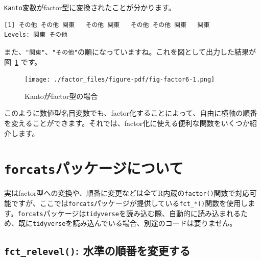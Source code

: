 \documentclass[
  a4paper,
  pandoc,
  ja=standard,
  jafont=haranoaji]{bxjsbook}
\newenvironment{Shaded}{\begin{snugshade}}{\end{snugshade}}
\newcommand{\NormalTok}[1]{\textcolor[rgb]{0.00,0.48,0.65}{#1}}
\newcommand{\SpecialCharTok}[1]{\textcolor[rgb]{0.37,0.37,0.37}{#1}}
\begin{document}
\texttt{Kanto}変数がfactor型に変換されたことが分かります。

\begin{Shaded}
\end{Shaded}

\begin{verbatim}
[1] その他 その他 関東   その他 関東   その他 その他 関東   関東  
Levels: 関東 その他
\end{verbatim}

また、\texttt{"関東"}、\texttt{"その他"}の順になっていますね。これを図として出力した結果が
図~\ref{fig-factor6} です。

\begin{figure}

{\centering \texttt{[image: ./factor\_files/figure-pdf/fig-factor6-1.png]}

}

\caption{\label{fig-factor6}Kantoがfactor型の場合}

\end{figure}

このように数値型名目変数でも、factor化することによって、自由に横軸の順番を変えることができます。それでは、factor化に使える便利な関数をいくつか紹介します。

\hypertarget{forcatsux30d1ux30c3ux30b1ux30fcux30b8ux306bux3064ux3044ux3066}{%
\section{\texorpdfstring{\texttt{forcats}パッケージについて}{forcatsパッケージについて}}\label{forcatsux30d1ux30c3ux30b1ux30fcux30b8ux306bux3064ux3044ux3066}}

実はfactor型への変換や、順番に変更などは全てR内蔵の\texttt{factor()}関数で対応可能ですが、ここでは\texttt{forcats}パッケージが提供している\texttt{fct\_*()}関数を使用します。\texttt{forcats}パッケージは\texttt{tidyverse}を読み込む際、自動的に読み込まれるため、既に\texttt{tidyverse}を読み込んでいる場合、別途のコードは要りません。

\hypertarget{fct_relevel-ux6c34ux6e96ux306eux9806ux756aux3092ux5909ux66f4ux3059ux308b}{%
\subsection{\texorpdfstring{\texttt{fct\_relevel()}:
水準の順番を変更する}{fct\_relevel(): 水準の順番を変更する}}\label{fct_relevel-ux6c34ux6e96ux306eux9806ux756aux3092ux5909ux66f4ux3059ux308b}}
\end{document}

